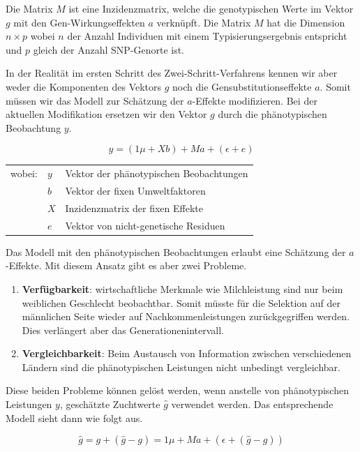 \documentclass[]{book}
\providecommand{\tightlist}{%
  \setlength{\itemsep}{0pt}\setlength{\parskip}{0pt}}
\begin{document}
Die Matrix \(M\) ist eine Inzidenzmatrix, welche die genotypischen Werte
im Vektor \(g\) mit den Gen-Wirkungseffekten \(a\) verknüpft. Die Matrix
\(M\) hat die Dimension \(n\times p\) wobei \(n\) der Anzahl Individuen
mit einem Typisierungsergebnis entspricht und \(p\) gleich der Anzahl
SNP-Genorte ist.

In der Realität im ersten Schritt des Zwei-Schritt-Verfahrens kennen wir
aber weder die Komponenten des Vektors \(g\) noch die
Gensubstitutionseffekte \(a\). Somit müssen wir das Modell zur Schätzung
der \(a\)-Effekte modifizieren. Bei der aktuellen Modifikation ersetzen
wir den Vektor \(g\) durch die phänotypischen Beobachtung \(y\).

\begin{equation}
  y = (1\mu + Xb) + Ma + (\epsilon+ e)
\end{equation}

\begin{tabular}{lll}
wobei:  &  $y$  &  Vektor der phänotypischen Beobachtungen \\
        &  $b$  &  Vektor der fixen Umweltfaktoren \\
        &  $X$  &  Inzidenzmatrix der fixen Effekte\\
        &  $e$  &  Vektor von nicht-genetische Residuen
\end{tabular}

Das Modell mit den phänotypischen Beobachtungen erlaubt eine Schätzung
der \(a\)-Effekte. Mit diesem Ansatz gibt es aber zwei Probleme.

\begin{enumerate}
\def\labelenumi{\arabic{enumi}.}
\tightlist
\item
  \textbf{Verfügbarkeit}: wirtschaftliche Merkmale wie Milchleistung
  sind nur beim weiblichen Geschlecht beobachtbar. Somit müsste für die
  Selektion auf der männlichen Seite wieder auf Nachkommenleistungen
  zurückgegriffen werden. Dies verlängert aber das
  Generationenintervall.
\item
  \textbf{Vergleichbarkeit}: Beim Austausch von Information zwischen
  verschiedenen Ländern sind die phänotypischen Leistungen nicht
  unbedingt vergleichbar.
\end{enumerate}

Diese beiden Probleme können gelöst werden, wenn anstelle von
phänotypischen Leistungen \(y\), geschätzte Zuchtwerte \(\hat{g}\)
verwendet werden. Das entsprechende Modell sieht dann wie folgt aus.

\begin{equation}
\hat{g} = g + (\hat{g} - g) = 1\mu + Ma + (\epsilon + (\hat{g} - g) )
\end{equation}
\end{document}
